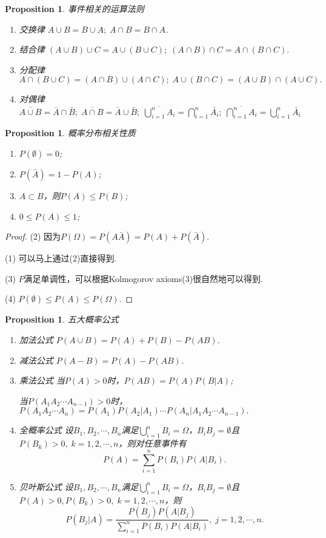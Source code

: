 \documentclass{article}
\newtheorem{proposition}[theorem]{Proposition}
\begin{document}
\begin{proposition}
\rm {\color{red}事件相关的运算法则}
\begin{enumerate}
	\item 交换律 $A \cup B = B \cup A;\;A \cap B = B \cap A$.
	\item 结合律 $(A \cup B) \cup C = A \cup (B \cup C);\; (A \cap B) \cap C = A \cap (B \cap C).$
	\item 分配律 $A \cap (B \cup C) = (A \cap B) \cup (A \cap C);\; A \cup (B \cap C) = (A \cup B) \cap (A \cup C).$
	\item 对偶律 $\overline{A \cup B} = \bar{A} \cap \bar{B};\; \overline{A \cap B} = \bar{A} \cup \bar{B};\; \overline{\bigcup\limits_{i=1}^n A_i} = \bigcap\limits_{i=1}^n \bar{A_i};\; \overline{\bigcap\limits_{i=1}^n A_i} = \bigcup\limits_{i=1}^n \bar{A_i}$ 
\end{enumerate}
\end{proposition}


\begin{proposition}
\rm {\color{red}概率分布相关性质}
\begin{enumerate}
	\item $P(\emptyset) = 0$;
	\item $P(\bar{A}) = 1 - P(A)$;
	\item $A\subset B$，则$P(A) \leq P(B)$;
	\item $0 \leq P(A) \leq 1$;
\end{enumerate}
\end{proposition}

\begin{proof}
(2) 因为$P(\Omega) = P(A\bar{A}) =P(A) + P(\bar{A})$.

(1) 可以马上通过(2)直接得到.

(3) $P$满足{\color{blue}单调性}，可以根据Kolmogorov axioms(3)很自然地可以得到.

(4) $P(\emptyset) \leq P(A) \leq P(\Omega).$
\end{proof}

\begin{proposition}
\rm 五大概率公式
\begin{enumerate}
	\item {\color{red}加法公式} $P(A \cup B) = P(A) + P(B) - P(AB)$.
	\item {\color{red}减法公式} $P(A - B) = P(A) - P(AB)$.
	\item {\color{red}乘法公式} 当$P(A) > 0$时，$P(AB) = P(A)P(B|A)$;
	
	当$P(A_1A_2\cdots A_{n-1}) > 0$时，$P(A_1A_2\cdots A_n) = P(A_1)P(A_2|A_1)\cdots P(A_n|A_1A_2\cdots A_{n-1}).$
	\item {\color{red}全概率公式} 设$B_1,B_2,\cdots,B_n$满足$\bigcup\limits_{i=1}^n B_i = \Omega$，$B_iB_j = \emptyset$且$P(B_k) > 0,\; k=1,2,\cdots,n$，则对任意事件有
	$$
		P(A) = \sum\limits_{i=1}^n P(B_i)P(A|B_i).
	$$
	\item {\color{red}贝叶斯公式} 设$B_1,B_2,\cdots,B_n$满足$\bigcup\limits_{i=1}^n B_i = \Omega$，$B_iB_j = \emptyset$且$P(A)>0, P(B_k) > 0,\; k=1,2,\cdots,n$，则
	$$
		P(B_j | A) = \frac{P(B_j)P(A|B_j)}{\sum\limits_{i=1}^n P(B_i)P(A|B_i)},\; j = 1,2,\cdots,n.
	$$
\end{enumerate}
\end{proposition}
\end{document}
